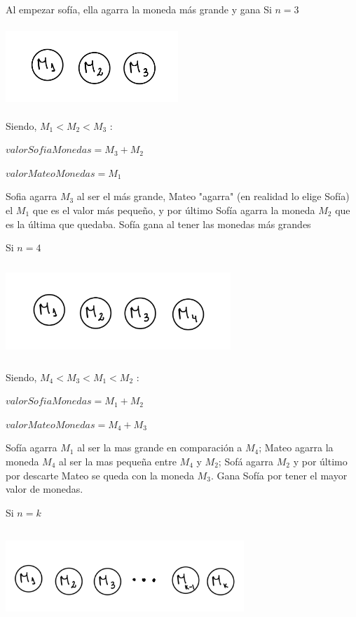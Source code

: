 Al empezar sofía, ella agarra la moneda más grande y gana
\vskip1cm
Si $n=3$

\includegraphics[width=6.5cm, height=3cm]{images/IMG_1627.jpg}

Siendo, $M_{1}<M_{2}<M_{3}$ : 


$valorSofiaMonedas=M_{3}+M_{2}$

$valorMateoMonedas=M_{1}$

Sofia agarra $M_{3}$ al ser el más grande, Mateo "agarra" (en realidad lo elige Sofía) el $M_{1}$ que es el valor
más pequeño, y por último Sofía agarra la moneda $M_{2}$ que es la última que quedaba. 
Sofía gana al tener las monedas más grandes

\vskip1cm
Si $n=4$

\includegraphics[width=8.5cm, height=3.5cm]{images/IMG_1628.jpg}

Siendo, $M_{4}<M_{3}<M_{1}<M_{2}$ : 

$valorSofiaMonedas=M_{1}+M_{2}$

$valorMateoMonedas=M_{4}+M_{3}$

Sofía agarra $M_{1}$ al ser la mas grande en comparación a $M_{4}$; Mateo agarra la moneda $M_{4}$ al ser la mas 
pequeña entre $M_{4}$ y $M_{2}$; Sofá agarra $M_{2}$ y por último por descarte Mateo se queda con la moneda $M_{3}$.
Gana Sofía por tener el mayor valor de monedas.

\vskip1cm
Si $n=k$

\includegraphics[width=9cm, height=3.5cm]{images/IMG_1629.jpg}

